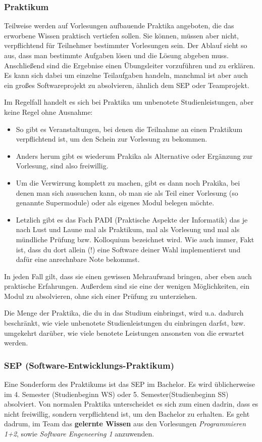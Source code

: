 \begin{multicols}{2}
	\subsubsection*{Praktikum}
	Teilweise werden auf Vorlesungen aufbauende Praktika angeboten, die das erworbene Wissen praktisch vertiefen sollen. Sie können, müssen aber nicht, verpflichtend für Teilnehmer bestimmter Vorlesungen sein. Der Ablauf sieht so aus, dass man bestimmte Aufgaben lösen und die Lösung abgeben muss. Anschließend sind die Ergebnise einen Übungsleiter vorzuführen und zu erklären. Es kann sich dabei um einzelne Teilaufgaben handeln, manchmal ist aber auch ein großes Softwareprojekt zu absolvieren, ähnlich dem SEP oder Teamprojekt. 

	Im Regelfall handelt es sich bei Praktika um unbenotete Studienleistungen, aber keine Regel ohne Ausnahme: 
	
	\begin{itemize}
		\item So gibt es Veranstaltungen, bei denen die Teilnahme an einen Praktikum verpflichtend ist, um den Schein zur Vorlesung zu bekommen. 
		\item Anders herum gibt es wiederum Prakika als Alternative oder Ergänzung zur Vorlesung, sind also freiwillig. 
		\item Um die Verwirrung komplett zu machen, gibt es dann noch Prakika, bei denen man sich aussuchen kann, ob man sie als Teil einer Vorlesung (so genannte Supermodule) oder als eigenes Modul belegen möchte.
		\item Letzlich gibt es das Fach PADI (Praktische Aspekte der Informatik) das je nach Lust und Laune mal als Praktikum, mal als Vorlesung und mal als mündliche Prüfung bzw. Kolloquium bezeichnet wird. Wie auch immer, Fakt ist, dass du dort allein (!) eine Software deiner Wahl implementierst und dafür eine anrechnbare Note bekommst.
	\end{itemize}

	In jeden Fall gilt, dass sie einen gewissen Mehraufwand bringen, aber eben auch praktische Erfahrungen. Außerdem sind sie eine der wenigen Möglichkeiten, ein Modul zu absolvieren, ohne sich einer Prüfung zu unterziehen.

	Die Menge der Praktika, die du in das Studium einbringst, wird u.a. dadurch beschränkt, wie viele unbenotete Studienleistungen du einbringen darfst, bzw. umgekehrt darüber, wie viele benotete Leistungen ansonsten von die erwartet werden.

	\subsubsection*{SEP (Software-Entwicklungs-Praktikum)}
	Eine Sonderform des Praktikums ist das SEP im Bachelor. Es wird üblicherweise im 4. Semester (Studienbeginn WS) oder 5. Semester(Studienbeginn SS) absolviert. Von normalen Praktika unterscheidet es sich zum einen dadrin, dass es nicht freiwillig, sondern verpflichtend ist, um den Bachelor zu erhalten. Es geht dadrum, im Team das \textbf{gelernte Wissen} aus den Vorlesungen \emph{Programmieren 1+2}, sowie \emph{Software Engeneering 1} anzuwenden.


\end{multicols}
